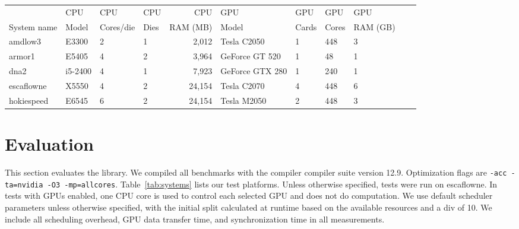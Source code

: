 \begin{table*}[t]
    \centering
    \scriptsize{
    \begin{tabular}{|l|l|l|l|r|l|l|l|l|r|l|}
\hline
		    & CPU     & CPU       & CPU  & CPU         & GPU             & GPU   & GPU   & GPU\\
	System name & Model   & Cores/die & Dies & RAM (MB)    & Model           & Cards & Cores & RAM (GB)\\
\hline
	amdlow3     & E3300   & 2         & 1    & 2,012       & Tesla C2050     & 1     & 448   & 3\\
	armor1      & E5405   & 4         & 2    & 3,964       & GeForce GT 520  & 1     & 48    & 1\\
	dna2        & i5-2400 & 4         & 1    & 7,923       & GeForce GTX 280 & 1     & 240   & 1\\
	escaflowne  & X5550   & 4         & 2    & 24,154      & Tesla C2070     & 4     & 448   & 6\\
	hokiespeed  & E6545   & 6         & 2    & 24,154      & Tesla M2050     & 2     & 448   & 3\\
\hline

    \end{tabular}
    }
    \caption{Test system specifications, all CPUs and GPUs are made by Intel and
             NVIDIA respectively.\label{tab:systems}}
\end{table*}

\section{Evaluation}
\label{sec:results}

This section evaluates the \tsar library. We compiled all benchmarks with the
\pgia compiler compiler suite version 12.9.  Optimization flags are \verb#-acc -ta=nvidia -O3 -mp=allcores#.
Table~\ref{tab:systems} lists our test platforms. Unless otherwise specified,
tests were run on escaflowne.  In tests with
GPUs enabled, one CPU core is used to control each selected GPU and does not do
computation. We use default scheduler parameters unless otherwise specified,
with the initial split calculated at runtime based on the available resources
and a div of 10. We include all scheduling overhead, GPU data transfer time,
and synchronization time in all measurements.



